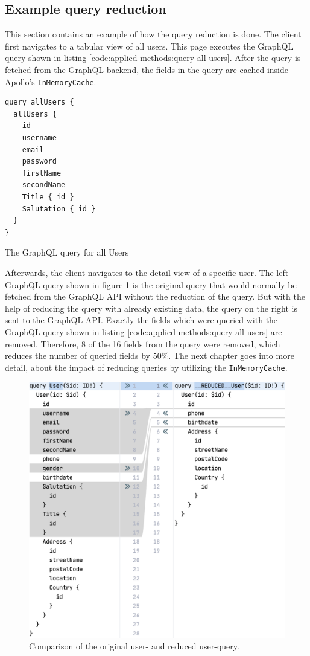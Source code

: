 \subsection{Example query reduction}\label{subsection:background:graphql:example-reduction}

This section contains an example of how the query reduction is done. The client first navigates to a tabular view of all users. This page executes the GraphQL query shown in listing \ref{code:applied-methods:query-all-users}. After the query is fetched from the GraphQL backend, the fields in the query are cached inside Apollo's \texttt{InMemoryCache}.

\ifshowListings
\begin{listing}[H]
\begin{verbatim}
query allUsers {
  allUsers {
    id
    username
    email
    password
    firstName
    secondName
    Title { id }
    Salutation { id }
  }
}
\end{verbatim}
\caption{The GraphQL query for all Users}\label{code:applied-methods:query-all-users}
\end{listing}
\fi

\noindent Afterwards, the client navigates to the detail view of a specific user. The left GraphQL query shown in figure \ref{fig:applied-methods:comparison-user-reduced-user} is the original query that would normally be fetched from the GraphQL \ac{API} without the reduction of the query. But with the help of reducing the query with already existing data, the query on the right is sent to the GraphQL \ac{API}. Exactly the fields which were queried with the GraphQL query shown in listing \ref{code:applied-methods:query-all-users} are removed. Therefore, 8 of the 16 fields from the query were removed, which reduces the number of queried fields by 50\%. The next chapter goes into more detail, about the impact of reducing queries by utilizing the \texttt{InMemoryCache}.

\ifshowImages
  \begin{figure}[H]
  \centering
  \includegraphics[width=0.65\linewidth]{images/reduction-graphql-examples/compare-user-reduced-user.png}
  \caption{Comparison of the original user- and reduced user-query.}\label{fig:applied-methods:comparison-user-reduced-user}
  \end{figure}
\fi
